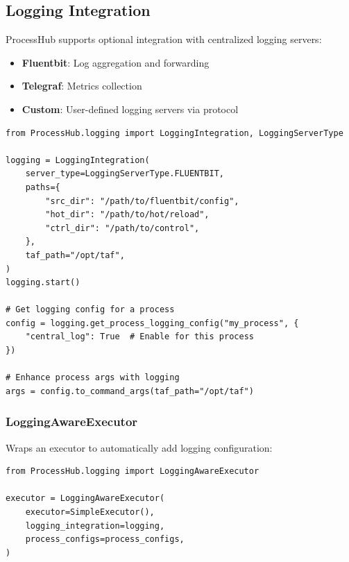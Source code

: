 \subsection{Logging Integration}

ProcessHub supports optional integration with centralized logging servers:

\begin{itemize}
   \item \textbf{Fluentbit}: Log aggregation and forwarding
   \item \textbf{Telegraf}: Metrics collection
   \item \textbf{Custom}: User-defined logging servers via protocol
\end{itemize}

\begin{verbatim}
from ProcessHub.logging import LoggingIntegration, LoggingServerType

logging = LoggingIntegration(
    server_type=LoggingServerType.FLUENTBIT,
    paths={
        "src_dir": "/path/to/fluentbit/config",
        "hot_dir": "/path/to/hot/reload",
        "ctrl_dir": "/path/to/control",
    },
    taf_path="/opt/taf",
)
logging.start()

# Get logging config for a process
config = logging.get_process_logging_config("my_process", {
    "central_log": True  # Enable for this process
})

# Enhance process args with logging
args = config.to_command_args(taf_path="/opt/taf")
\end{verbatim}

\subsubsection{LoggingAwareExecutor}

Wraps an executor to automatically add logging configuration:

\begin{verbatim}
from ProcessHub.logging import LoggingAwareExecutor

executor = LoggingAwareExecutor(
    executor=SimpleExecutor(),
    logging_integration=logging,
    process_configs=process_configs,
)
\end{verbatim}

